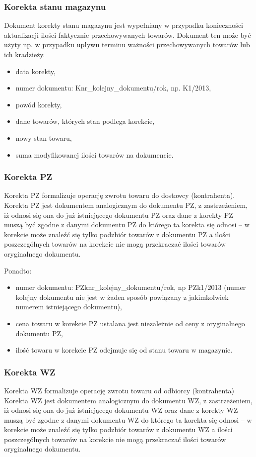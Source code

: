 \subsubsection{Korekta stanu magazynu}
Dokument korekty stanu magazynu jest wypełniany w przypadku
konieczności aktualizacji ilości faktycznie przechowywanych towarów.
Dokument ten może być użyty np. w przypadku upływu terminu ważności
przechowywanych towarów lub ich kradzieży.
\begin{itemize}
\item data korekty,
\item numer dokumentu: Knr\_kolejny\_dokumentu/rok, np. K1/2013,
\item powód korekty,
\item dane towarów, których stan podlega korekcie,
\item nowy stan towaru,
\item suma modyfikowanej ilości towarów na dokumencie.
\end{itemize}

\subsubsection{Korekta PZ}
Korekta PZ formalizuje operację zwrotu towaru do dostawcy
(kontrahenta).  Korekta PZ jest dokumentem analogicznym do dokumentu
PZ, z zastrzeżeniem, iż odnosi się ona do już istniejącego dokumentu
PZ oraz dane z korekty PZ muszą być zgodne z danymi dokumentu PZ do
którego ta korekta się odnosi -- w korekcie może znaleźć się tylko
podzbiór towarów z dokumentu PZ a ilości poszczególnych towarów na
korekcie nie mogą przekraczać ilości towarów oryginalnego dokumentu.

Ponadto:
\begin{itemize}
\item numer dokumentu: PZknr\_kolejny\_dokumentu/rok, np PZk1/2013
  (numer kolejny dokumentu nie jest w żaden sposób powiązany z
  jakimkolwiek numerem istniejącego dokumentu),
\item cena towaru w korekcie PZ ustalana jest niezależnie od ceny z
  oryginalnego dokumentu PZ,
\item ilość towaru w korekcie PZ odejmuje się od stanu towaru w
  magazynie.
\end{itemize}

\subsubsection{Korekta WZ}
Korekta WZ formalizuje operację zwrotu towaru od odbiorcy
(kontrahenta) Korekta WZ jest dokumentem analogicznym do dokumentu WZ,
z zastrzeżeniem, iż odnosi się ona do już istniejącego dokumentu WZ
oraz dane z korekty WZ muszą być zgodne z danymi dokumentu WZ do
którego ta korekta się odnosi -- w korekcie może znaleźć się tylko
podzbiór towarów z dokumentu WZ a ilości poszczególnych towarów na
korekcie nie mogą przekraczać ilości towarów oryginalnego dokumentu.

